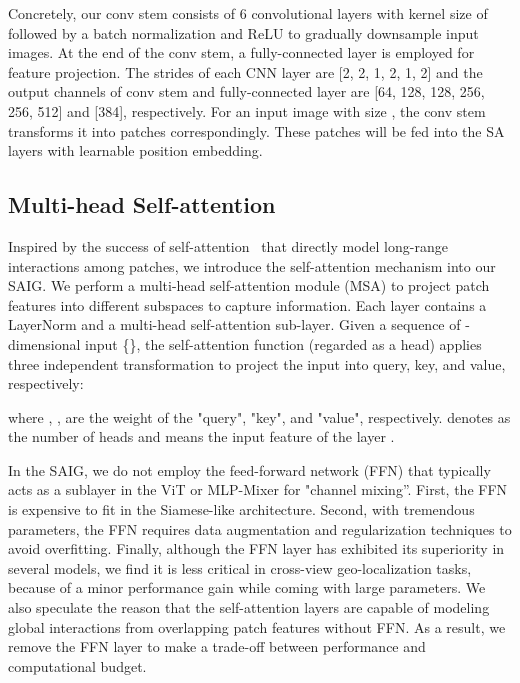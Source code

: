 \documentclass[sn-basic,iicol]{sn-jnl}
\theoremstyle{thmstyletwo}\newtheorem{example}{Example}\newtheorem{remark}{Remark}
\theoremstyle{thmstylethree}\newtheorem{definition}{Definition}
\begin{document}
Concretely, our conv stem consists of 6 convolutional layers with kernel size of  followed by a batch normalization and ReLU to gradually downsample input images. At the end of the conv stem, a fully-connected layer is employed for feature projection. The strides of each CNN layer are [2, 2, 1, 2, 1, 2] and the output channels of conv stem and fully-connected layer are [64, 128, 128, 256, 256, 512] and [384], respectively. For an input image with size , the conv stem transforms it into  patches correspondingly. These patches will be fed into the SA layers with learnable position embedding.

\subsection{Multi-head Self-attention}\label{MSA}

Inspired by the success of self-attention~\citep{Transformer2017} that directly model long-range interactions among patches, we introduce the self-attention mechanism into our SAIG. We perform a multi-head self-attention module (MSA) to project patch features into different subspaces to capture information. Each layer contains a LayerNorm and a multi-head self-attention sub-layer. Given a sequence of -dimensional input \{\}, the self-attention function (regarded as a head) applies three independent transformation to project the input into query, key, and value, respectively:



where , ,  are the weight of the "query", "key", and "value", respectively.  denotes as the number of heads and  means the input feature of the layer . 

In the SAIG, we do not employ the feed-forward network (FFN) that typically acts as a sublayer in the ViT or MLP-Mixer for "channel mixing”. First, the FFN is expensive to fit in the Siamese-like architecture. Second, with tremendous parameters, the FFN requires data augmentation and regularization techniques to avoid overfitting. Finally, although the FFN layer has exhibited its superiority in several models, we find it is less critical in cross-view geo-localization tasks, because of a minor performance gain while coming with large parameters. We also speculate the reason that the self-attention layers are capable of modeling global interactions from overlapping patch features without FFN. As a result, we remove the FFN layer to make a trade-off between performance and computational budget.
\end{document}
